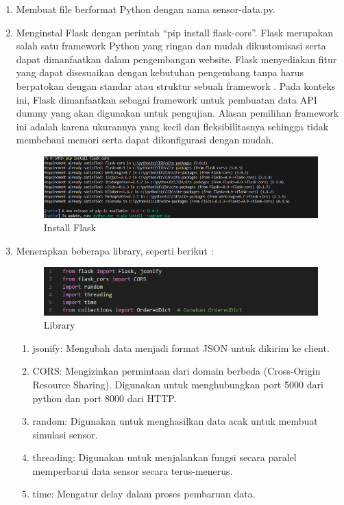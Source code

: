 \begin{enumerate}[label={\alph*.}]
\begin{enumerate}[label={\arabic*.}]
		\item Membuat file berformat Python dengan nama sensor-data.py.
		\item Menginstal Flask dengan perintah “pip install flask-cors”. Flask merupakan salah satu framework Python yang ringan dan mudah dikustomisasi serta dapat dimanfaatkan dalam pengembangan website. Flask menyediakan fitur yang dapat disesuaikan dengan kebutuhan pengembang tanpa harus berpatokan dengan standar atau struktur sebuah framework \cite{Flask}. Pada konteks ini, Flask dimanfaatkan sebagai framework untuk pembuatan data API dummy yang akan digunakan untuk pengujian. Alasan pemilihan framework ini adalah karena ukurannya yang kecil dan fleksibilitasnya sehingga tidak membebani memori serta dapat dikonfigurasi dengan mudah. 
		\begin{figure}[H]
			\centering
			\includegraphics[width=0.8\linewidth]{gambar/Dasar teori/Flask.png}
			\caption{Install Flask}
			\label{Instal Flask}
		\end{figure}
		
		\item Menerapkan beberapa library, seperti berikut : 
		\begin{figure}[H]
			\centering
			\includegraphics[width=0.8\linewidth]{gambar/Dasar teori/Library.png}
			\caption{Library}
			\label{Menambahkan Library}
		\end{figure}
		\begin{enumerate}[label={\alph*.}]
			\item jsonify: Mengubah data menjadi format JSON untuk dikirim ke client.
			\item CORS: Mengizinkan permintaan dari domain berbeda (Cross-Origin Resource Sharing). Digunakan untuk menghubungkan port 5000 dari python dan port 8000 dari HTTP. 
			\item random: Digunakan untuk menghasilkan data acak untuk membuat simulasi sensor. 
			\item threading: Digunakan untuk menjalankan fungsi secara paralel memperbarui data sensor secara terus-menerus.
			\item time: Mengatur delay dalam proses pembaruan data.
		\end{enumerate}
		

\end{enumerate}
\end{enumerate}

